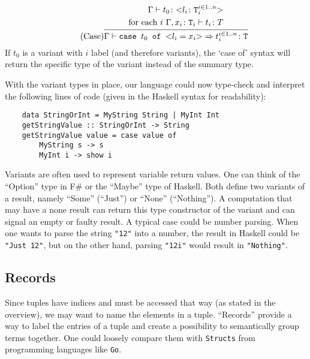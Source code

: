 \begin{equation*}
    \tag{Case}
    \infer{
    \Gamma \vdash \texttt{case } t_0 \texttt{ of } \text{<}l_i=x_i\text{>} \Rightarrow t_i^{i \in 1..n} \colon \texttt{T}
    }{
    \begin{split}
        \Gamma \vdash t_0 \colon \text{<}l_i \colon \texttt{T}_i^{i \in 1..n}\text{>} \\
        \text{for each } i \text{    } \Gamma, x_i \colon \texttt{T}_i \vdash t_i \colon T
    \end{split}
    }
\end{equation*}
If $t_0$ is a variant with $i$ label (and therefore variants), the `case of' syntax
will return the specific type of the variant instead of the summary type.

With the variant types in place, our language could now type-check and interpret
the following lines of code (given in the Haskell syntax for readability):

\begin{verbatim}
    data StringOrInt = MyString String | MyInt Int
    getStringValue :: StringOrInt -> String
    getStringValue value = case value of
        MyString s -> s
        MyInt i -> show i
\end{verbatim}

Variants are often used to represent variable return values.
One can think of the ``Option'' type in F\# or the ``Maybe'' type
of Haskell. Both define two variants of a result, namely ``Some'' (``Just'')
or ``None'' (``Nothing''). A computation that may have a none result can return
this type constructor of the variant and can signal an empty or faulty result.
A typical case could be number parsing. When one wants to parse the string
\texttt{"12"} into a number, the result in Haskell could be \texttt{"Just 12"}, but
on the other hand, parsing \texttt{"12i"} would result in \texttt{"Nothing"}.

\subsection{Records}
\label{subsec:Records}

Since tuples have indices and must be accessed that way (as stated in the overview), we may want to
name the elements in a tuple. ``Records'' provide a way to label the entries
of a tuple and create a possibility to semantically group terms together.
One could loosely compare them with \texttt{Structs} from programming
languages like \texttt{Go}.

